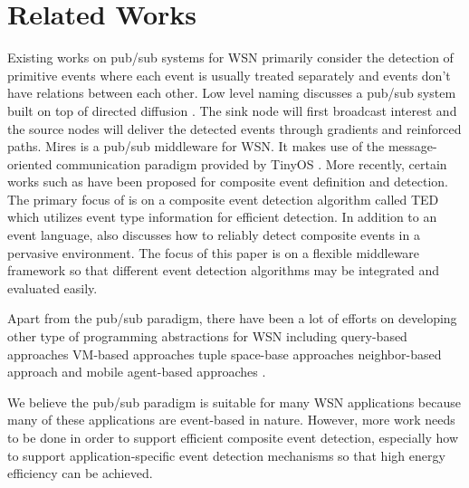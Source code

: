 \section{Related Works}
\label{sec:relatedworks}
Existing works on pub/sub systems for WSN primarily consider the detection of primitive events where each event is usually treated separately and events don't have relations between each other. Low level naming \cite{lowlevelnaming} discusses a pub/sub system built on top of directed diffusion \cite{directeddiffusion}. The sink node will first broadcast interest and the source nodes will deliver the detected events through gradients and reinforced paths. Mires \cite{mires} is a pub/sub middleware for WSN. It makes use of the message-oriented communication paradigm provided by TinyOS \cite{nesc}. More recently, certain works such as \cite{lai:ted} have been proposed for composite event definition and detection. The primary focus of \cite{lai:ted} is on a composite event detection algorithm called TED which utilizes event type information for efficient detection. In addition to an event language, \cite{complexevent} also discusses how to reliably detect composite events in a pervasive environment. The focus of this paper is on a flexible middleware framework so that different event detection algorithms may be integrated and evaluated easily.

Apart from the pub/sub paradigm, there have been a lot of efforts on developing other type of programming abstractions for WSN including query-based approaches \cite{tinydb} VM-based approaches \cite{mate} tuple space-base approaches \cite{tinylime} neighbor-based approach \cite{hood} and mobile agent-based approaches \cite{agilla}.

We believe the pub/sub paradigm is suitable for many WSN applications because many of these applications are event-based in nature. However, more work needs to be done in order to support efficient composite event detection, especially how to support application-specific event detection mechanisms so that high energy efficiency can be achieved.